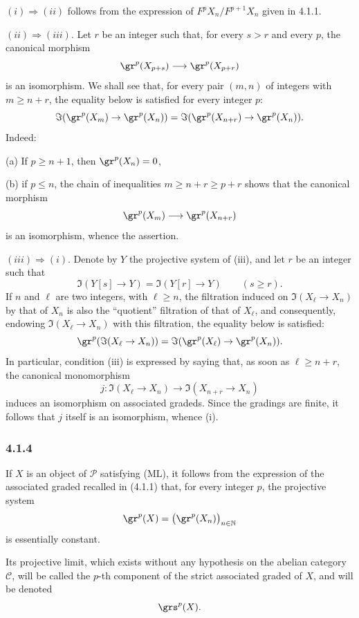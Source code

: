 \begin{prooftext}[Proof]
$(i)\Rightarrow(ii)$ follows from the expression of $F^pX_n/F^{p+1}X_n$ given in 4.1.1.

$(ii)\Rightarrow(iii)$. Let $r$ be an integer such that, for every $s>r$ and every $p$, the canonical morphism
\[
\gr^p(X_{p+s})\longrightarrow \gr^p(X_{p+r})
\]
is an isomorphism. We shall see that, for every pair $(m,n)$ of integers with $m\ge n+r$, the equality below is satisfied for every integer $p$:
\[
\Im(\gr^p(X_m)\to\gr^p(X_n))=
\Im(\gr^p(X_{n+r})\to\gr^p(X_n)).
\]
Indeed:

(a) If $p\ge n+1$, then $\gr^p(X_n)=0$,

(b) if $p\le n$, the chain of inequalities $m\ge n+r\ge p+r$ shows that the canonical morphism
\[
\gr^p(X_m)\longrightarrow\gr^p(X_{n+r})
\]
is an isomorphism, whence the assertion.

$(iii)\Rightarrow(i)$. Denote by $Y$ the projective system of (iii), and let $r$ be an integer such that
\[
\Im(Y[s]\to Y)=\Im(Y[r]\to Y)\qquad(s\ge r).
\]
If $n$ and $\ell$ are two integers, with $\ell\ge n$, the filtration induced on $\Im(X_\ell\to X_n)$ by that of $X_n$ is also the ``quotient'' filtration of that of $X_\ell$, and consequently, endowing $\Im(X_\ell\to X_n)$ with this filtration, the equality below is satisfied:
\[
\gr^p(\Im(X_\ell\to X_n))=
\Im(\gr^p(X_\ell)\to\gr^p(X_n)).
\]
In particular, condition (iii) is expressed by saying that, as soon as $\ell\ge n+r$, the canonical monomorphism
\[
j:\Im(X_\ell\to X_n)\longrightarrow\Im(X_{n+r}\to X_n)
\]
induces an isomorphism on associated gradeds. Since the gradings are finite, it follows that $j$ itself is an isomorphism, whence (i).
\end{prooftext}


\subsubsection*{4.1.4}
If \(X\) is an object of \(\mathcal P\) satisfying (ML), it follows from the expression of the associated graded recalled in (4.1.1) that, for every integer \(p\), the projective system
\[
\gr^p(X)=\bigl(\gr^p(X_n)\bigr)_{n\in\mathbb N}
\]
is essentially constant.

Its projective limit, which exists without any hypothesis on the abelian category \(\mathcal C\), will be called the \(p\)-th component of the strict associated graded of \(X\), and will be denoted
\[
\grs^p(X).
\]

